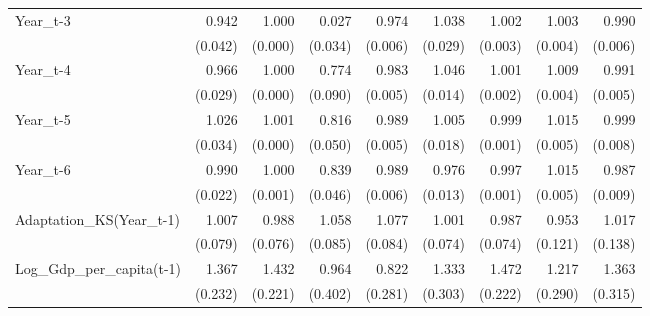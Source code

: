 \begin{table}[htbp]
\begin{tabular}{l*{8}{D{.}{.}{-1}}}
Year\_t-3    &       0.942         &       1.000         &       0.027\sym{***}&       0.974\sym{***}&       1.038         &       1.002         &       1.003         &       0.990\sym{\%}  \\
            &     (0.042)         &     (0.000)         &     (0.034)         &     (0.006)         &     (0.029)         &     (0.003)         &     (0.004)         &     (0.006)         \\
Year\_t-4    &       0.966         &       1.000         &       0.774\sym{**} &       0.983\sym{***}&       1.046\sym{***}&       1.001         &       1.009\sym{**} &       0.991\sym{\%}  \\
            &     (0.029)         &     (0.000)         &     (0.090)         &     (0.005)         &     (0.014)         &     (0.002)         &     (0.004)         &     (0.005)         \\
Year\_t-5    &       1.026         &       1.001\sym{*}  &       0.816\sym{***}&       0.989\sym{**} &       1.005         &       0.999         &       1.015\sym{***}&       0.999         \\
            &     (0.034)         &     (0.000)         &     (0.050)         &     (0.005)         &     (0.018)         &     (0.001)         &     (0.005)         &     (0.008)         \\
Year\_t-6    &       0.990         &       1.000         &       0.839\sym{***}&       0.989\sym{*}  &       0.976\sym{*}  &       0.997\sym{*}  &       1.015\sym{***}&       0.987\sym{\%}  \\
            &     (0.022)         &     (0.001)         &     (0.046)         &     (0.006)         &     (0.013)         &     (0.001)         &     (0.005)         &     (0.009)         \\
Adaptation\_KS(Year\_t-1)&       1.007         &       0.988         &       1.058         &       1.077         &       1.001         &       0.987         &       0.953         &       1.017         \\
            &     (0.079)         &     (0.076)         &     (0.085)         &     (0.084)         &     (0.074)         &     (0.074)         &     (0.121)         &     (0.138)         \\
Log\_Gdp\_per\_capita(t-1)&       1.367\sym{*}  &       1.432\sym{**} &       0.964         &       0.822         &       1.333         &       1.472\sym{**} &       1.217         &       1.363         \\
            &     (0.232)         &     (0.221)         &     (0.402)         &     (0.281)         &     (0.303)         &     (0.222)         &     (0.290)         &     (0.315)         \\

\end{tabular}
\end{table}

